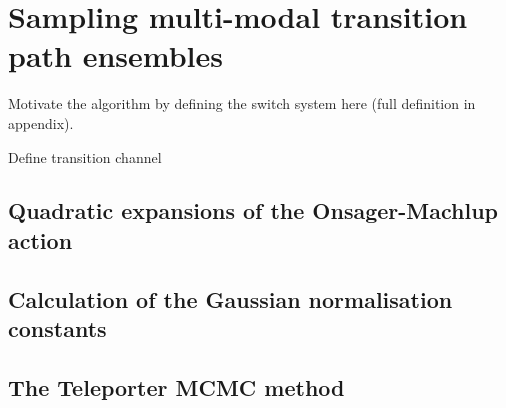 \section{Sampling multi-modal transition path ensembles} \label{sec:Teleporter MCMC}

Motivate the algorithm by defining the switch system here (full definition in appendix).

Define transition channel

\subsection{Quadratic expansions of the Onsager-Machlup action}

\subsection{Calculation of the Gaussian normalisation constants}

\subsection{The Teleporter MCMC method}

